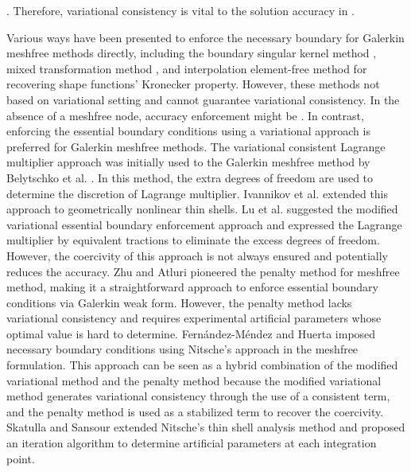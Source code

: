 {{\cite{li2016, wu2021}}\hskip0pt%
. }\DIFaddend Therefore, variational consistency is vital to the solution accuracy in \DIFdelbegin {}\DIFdelend \DIFaddbegin {}\DIFaddend .

Various ways have been presented to enforce the necessary boundary for Galerkin meshfree methods directly, including the boundary singular kernel method \cite{chen2000a}, mixed transformation method  \cite{chen2000a}, and interpolation element-free method \cite{liu2019a} for recovering shape functions’ Kronecker property. However, these methods \DIFdelbegin {}\DIFdelend \DIFaddbegin {}\DIFaddend not based on \DIFdelbegin {}\DIFdelend variational setting and cannot guarantee variational consistency. In the absence of a meshfree node, accuracy enforcement might be \DIFdelbegin {}\DIFdelend \DIFaddbegin {}\DIFaddend . In contrast, enforcing the essential boundary conditions using a variational approach is preferred for Galerkin meshfree methods. The variational consistent Lagrange multiplier approach was initially used to the Galerkin meshfree method by Belytschko et al. \cite{belytschko1994}. In this method, the extra degrees of freedom are used to determine the discretion of Lagrange multiplier. \DIFdelbegin {}\DIFdelend Ivannikov et al. \cite{ivannikov2014a} \DIFdelbegin {}\DIFdelend extended this approach to geometrically nonlinear thin shells. Lu et al. \cite{lu1994} suggested the modified variational essential boundary enforcement approach and expressed the Lagrange multiplier by equivalent tractions to eliminate the excess degrees of freedom. However, the coercivity of this approach is not always ensured and potentially reduces the accuracy. Zhu and Atluri \cite{zhu1998} pioneered the penalty method for meshfree method, making it a straightforward approach to enforce essential boundary conditions via Galerkin weak form. However, the penalty method lacks variational consistency and requires experimental artificial parameters whose optimal value is hard to determine. Fernández-Méndez and Huerta \cite{fernandez-mendez2004} imposed necessary boundary conditions using Nitsche's approach in the meshfree formulation. This approach can be seen as a hybrid combination of the modified variational method and the penalty method because the modified variational method generates variational consistency through the use of a consistent term, and the penalty method is used as a stabilized term to recover the coercivity. Skatulla and Sansour \cite{skatulla2008} extended Nitsche’s thin shell analysis method and proposed an iteration algorithm to determine artificial parameters at each integration point.

